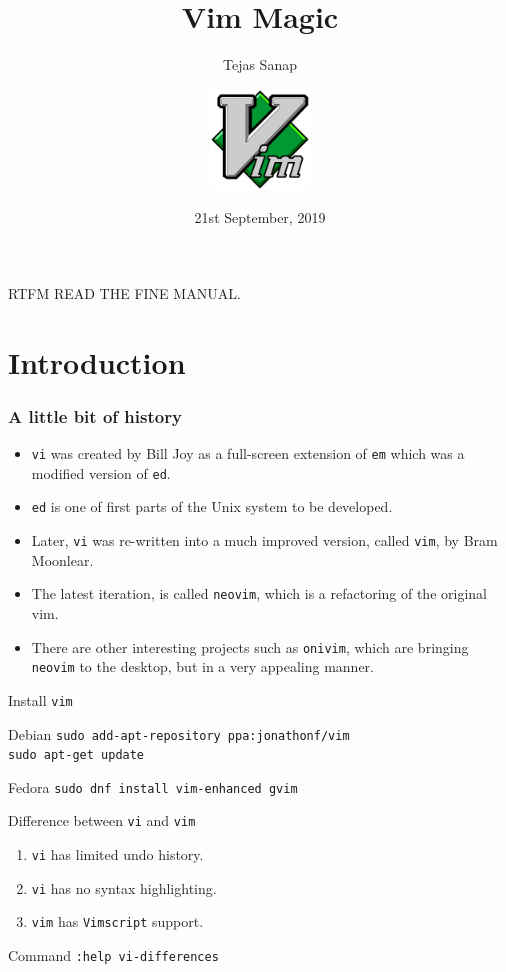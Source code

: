 \documentclass[11pt]{beamer}
\title{\Huge Vim Magic}
\subtitle{\Large Tejas Sanap}
\author{\includegraphics[width=0.2\textwidth]{Vimlogo.png}}
\date{\small 21st September, 2019}
\begin{document}
	\begin{frame}
		\titlepage
	\end{frame}
	\begin{frame}
		\tableofcontents
	\end{frame}
	\begin{frame}{RTFM}
		\Huge READ THE FINE MANUAL.
	\end{frame}

	\section{Introduction}

		\begin{frame}
			\setcounter{framenumber}{1}
			\frametitle{A little bit of history}
			\begin{itemize}
				\item \texttt{vi} was created by Bill Joy as a full-screen extension of \texttt{em} which was a modified version of \texttt{ed}.
				\item \texttt{ed} is one of first parts of the Unix system to be developed.
				\item Later, \texttt{vi} was re-written into a much improved version, called \texttt{vim}, by Bram Moonlear.
				\item The latest iteration, is called \texttt{neovim}, which is a refactoring of the original vim.
				\item There are other interesting projects such as \texttt{onivim}, which are bringing \texttt{neovim} to the desktop, but in a very appealing manner.
			\end{itemize}
		\end{frame}

		\begin{frame}{Install \texttt{vim}}
			\begin{block}{Debian}
				\texttt{sudo add-apt-repository ppa:jonathonf/vim} \\
				\texttt{sudo apt-get update}
			\end{block}
			\begin{block}{Fedora}
				\texttt{sudo dnf install vim-enhanced gvim} 
			\end{block}
		\end{frame}

		\begin{frame}{Difference between \texttt{vi} and \texttt{vim}}
			\begin{enumerate}
				\item \texttt{vi} has limited undo history.
				\item \texttt{vi} has no syntax highlighting.
				\item \texttt{vim} has \texttt{Vimscript} support.
			\end{enumerate}
			\begin{block}{Command}
				\texttt{:help vi-differences}
			\end{block}
		\end{frame}
\end{document}
